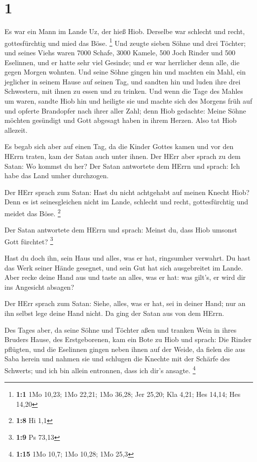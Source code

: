 \hypertarget{section}{%
\section{1}\label{section}}

 Es war ein Mann im Lande Uz, der hieß Hiob. Derselbe war
schlecht und recht, gottesfürchtig und mied das Böse. \footnote{\textbf{1:1}
  1Mo 10,23; 1Mo 22,21; 1Mo 36,28; Jer 25,20; Kla 4,21; Hes 14,14; Hes
  14,20}  Und zeugte sieben Söhne und drei Töchter;
 und seines Viehs waren 7000 Schafe, 3000 Kamele, 500 Joch
Rinder und 500 Eselinnen, und er hatte sehr viel Gesinde; und er war
herrlicher denn alle, die gegen Morgen wohnten.  Und seine
Söhne gingen hin und machten ein Mahl, ein jeglicher in seinem Hause auf
seinen Tag, und sandten hin und luden ihre drei Schwestern, mit ihnen zu
essen und zu trinken.  Und wenn die Tage des Mahles um
waren, sandte Hiob hin und heiligte sie und machte sich des Morgens früh
auf und opferte Brandopfer nach ihrer aller Zahl; denn Hiob gedachte:
Meine Söhne möchten gesündigt und Gott abgesagt haben in ihrem Herzen.
Also tat Hiob allezeit.

 Es begab sich aber auf einen Tag, da die Kinder Gottes
kamen und vor den HErrn traten, kam der Satan auch unter ihnen.
 Der HErr aber sprach zu dem Satan: Wo kommst du her? Der
Satan antwortete dem HErrn und sprach: Ich habe das Land umher
durchzogen.

 Der HErr sprach zum Satan: Hast du nicht achtgehabt auf
meinen Knecht Hiob? Denn es ist seinesgleichen nicht im Lande, schlecht
und recht, gottesfürchtig und meidet das Böse. \footnote{\textbf{1:8} Hi
  1,1}

 Der Satan antwortete dem HErrn und sprach: Meinst du, dass
Hiob umsonst Gott fürchtet? \footnote{\textbf{1:9} Ps 73,13}

 Hast du doch ihn, sein Haus und alles, was er hat,
ringsumher verwahrt. Du hast das Werk seiner Hände gesegnet, und sein
Gut hat sich ausgebreitet im Lande.  Aber recke deine Hand
aus und taste an alles, was er hat: was gilt's, er wird dir ins
Angesicht absagen?

 Der HErr sprach zum Satan: Siehe, alles, was er hat, sei
in deiner Hand; nur an ihn selbst lege deine Hand nicht. Da ging der
Satan aus von dem HErrn.

 Des Tages aber, da seine Söhne und Töchter aßen und
tranken Wein in ihres Bruders Hause, des Erstgeborenen, 
kam ein Bote zu Hiob und sprach: Die Rinder pflügten, und die Eselinnen
gingen neben ihnen auf der Weide,  da fielen die aus Saba
herein und nahmen sie und schlugen die Knechte mit der Schärfe des
Schwerts; und ich bin allein entronnen, dass ich dir's ansagte.
\footnote{\textbf{1:15} 1Mo 10,7; 1Mo 10,28; 1Mo 25,3}

